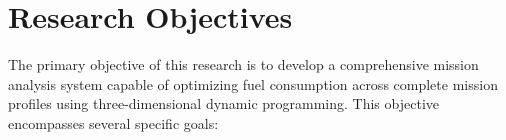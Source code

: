 \section{Research Objectives}

The primary objective of this research is to develop a comprehensive mission analysis system capable of optimizing fuel consumption across complete mission profiles using three-dimensional dynamic programming. This objective encompasses several specific goals:

